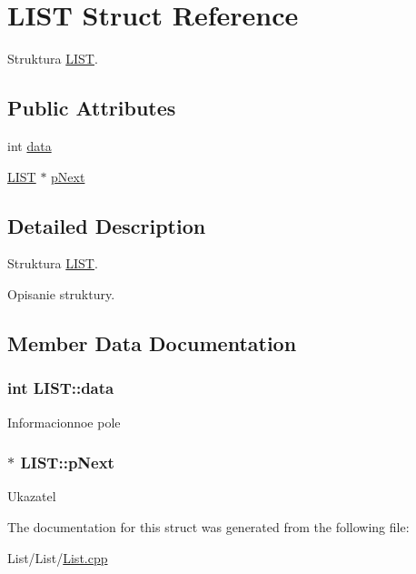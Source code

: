 \hypertarget{struct_l_i_s_t}{}\section{L\+I\+S\+T Struct Reference}
\label{struct_l_i_s_t}


Struktura \hyperlink{struct_l_i_s_t}{L\+I\+S\+T}.  


\subsection*{Public Attributes}
\begin{DoxyCompactItemize}
\item 
int \hyperlink{struct_l_i_s_t_abb6ca66dbf2fc388717bbb0eb55c9d1e}{data}
\item 
\hyperlink{struct_l_i_s_t}{L\+I\+S\+T} $\ast$ \hyperlink{struct_l_i_s_t_a28c019892bdefe5061f0283d96230f1f}{p\+Next}
\end{DoxyCompactItemize}


\subsection{Detailed Description}
Struktura \hyperlink{struct_l_i_s_t}{L\+I\+S\+T}. 

Opisanie struktury. 

\subsection{Member Data Documentation}
\hypertarget{struct_l_i_s_t_abb6ca66dbf2fc388717bbb0eb55c9d1e}{}
\subsubsection[{data}]{\setlength{\rightskip}{0pt plus 5cm}int L\+I\+S\+T\+::data}\label{struct_l_i_s_t_abb6ca66dbf2fc388717bbb0eb55c9d1e}
Informacionnoe pole \hypertarget{struct_l_i_s_t_a28c019892bdefe5061f0283d96230f1f}{}
\subsubsection[{p\+Next}]{$\ast$ L\+I\+S\+T\+::p\+Next}\label{struct_l_i_s_t_a28c019892bdefe5061f0283d96230f1f}
Ukazatel\textquotesingle{} 

The documentation for this struct was generated from the following file\+:\begin{DoxyCompactItemize}
\item 
List/\+List/\hyperlink{_list_8cpp}{List.\+cpp}\end{DoxyCompactItemize}
